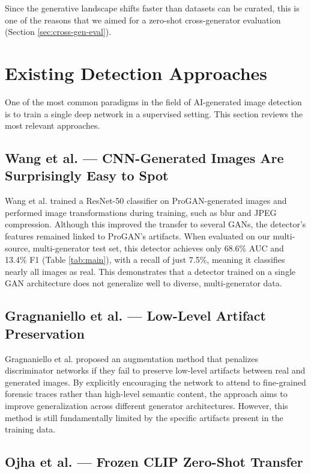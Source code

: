 Since the generative landscape shifts faster than datasets can be curated, this is one of the reasons that we aimed for a zero-shot cross-generator evaluation (Section \ref{sec:cross-gen-eval}).


\section{Existing Detection Approaches}\label{sec:detection-approaches}

One of the most common paradigms in the field of AI-generated image detection is to train a single deep network in a supervised setting. This section reviews the most relevant approaches.


\subsection{Wang et al. --- CNN-Generated Images Are Surprisingly Easy to Spot}\label{sec:wang}

Wang et al. \cite{wang2020cnn} trained a ResNet-50 classifier on ProGAN-generated images and performed image transformations during training, such as blur and JPEG compression. Although this improved the transfer to several GANs, the detector's features remained linked to ProGAN's artifacts. When evaluated on our multi-source, multi-generator test set, this detector achieves only 68.6\% AUC and 13.4\% F1 (Table \ref{tab:main}), with a recall of just 7.5\%, meaning it classifies nearly all images as real. This demonstrates that a detector trained on a single GAN architecture does not generalize well to diverse, multi-generator data.


\subsection{Gragnaniello et al. --- Low-Level Artifact Preservation}\label{sec:gragnaniello}

Gragnaniello et al. \cite{gragnaniello2021gan} proposed an augmentation method that penalizes discriminator networks if they fail to preserve low-level artifacts between real and generated images. By explicitly encouraging the network to attend to fine-grained forensic traces rather than high-level semantic content, the approach aims to improve generalization across different generator architectures. However, this method is still fundamentally limited by the specific artifacts present in the training data.


\subsection{Ojha et al. --- Frozen CLIP Zero-Shot Transfer}\label{sec:ojha}

